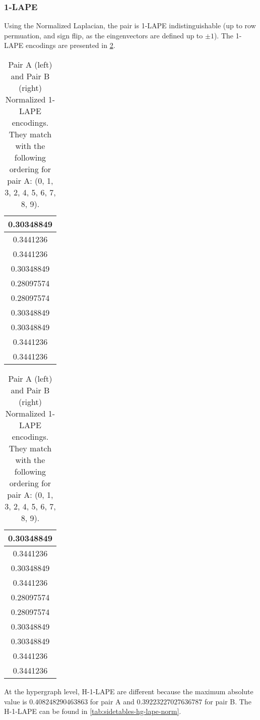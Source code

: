 \subsubsection{1-LAPE}

Using the Normalized Laplacian, the pair is 1-LAPE indistinguishable (up to row permuation, and sign flip, as the eingenvectors are defined up to $\pm1$). The 1-LAPE encodings are presented in \ref{tab:sidetables-g-lape-norm}.

\begin{table}[H]
\centering
\footnotesize
  \begin{tabular}{|c|}
    \hline
    0.30348849 \\
         \hline
    0.3441236\\
         \hline
    0.3441236\\
         \hline
   0.30348849 \\
        \hline
  0.28097574 \\
       \hline
  0.28097574 \\
       \hline
  0.30348849 \\
       \hline
  0.30348849 \\
       \hline
  0.3441236  \\
       \hline
  0.3441236 \\ 
    \hline
  \end{tabular}
  \begin{tabular}{|c|}
    \hline
  0.30348849 \\
       \hline
  0.3441236 \\
       \hline
  0.30348849 \\
       \hline
  0.3441236  \\
       \hline
  0.28097574 \\
       \hline
  0.28097574 \\
       \hline
  0.30348849 \\
       \hline
  0.30348849 \\
       \hline
  0.3441236  \\
       \hline
  0.3441236 \\
    \hline
  \end{tabular}
\caption{Pair A (left) and Pair B (right) Normalized 1-LAPE encodings. They match with the following ordering for pair A: (0, 1, 3, 2, 4, 5, 6, 7, 8, 9).}
\label{tab:sidetables-g-lape-norm}
\end{table}

At the hypergraph level, H-1-LAPE are different because the maximum absolute value is $0.408248290463863$ for pair A and $0.39223227027636787$ for pair B. The H-1-LAPE can be found in \ref{tab:sidetables-hg-lape-norm}.


